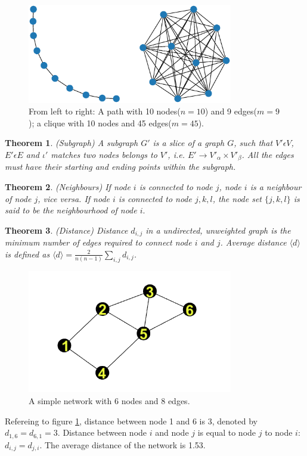 \documentclass[12pt]{article}
\newtheorem{theorem}{Theorem}[section]
\begin{document}
\begin{figure}[!h]
    \centering
    \includegraphics[width=0.8\textwidth]{path_clique.eps}
    \caption{From left to right: A path with 10 nodes($n=10$) and 9 edges($m=9$); a clique with 10 nodes and 45 edges($m=45$).}
\end{figure}
\begin{theorem}{(Subgraph)}
    A subgraph $G'$ is a slice of a graph $G$, such that $V' \epsilon V$, $E' \epsilon E$ and $\iota'$ matches two nodes belongs to $V'$, i.e. $E'\rightarrow V'_\alpha\times V'_\beta $. All the edges must have their starting and ending points within the subgraph.
\end{theorem}
\begin{theorem}{(Neighbours)}
    If node $i$ is connected to node $j$, node $i$ is a neighbour of node $j$, vice versa. If node $i$ is connected to node $j,k,l$, the node set $\{j,k,l\}$ is said to be the neighbourhood of node $i.$
\end{theorem}
\begin{theorem}{(Distance)}
    Distance $d_{i,j}$ in a undirected, unweighted graph is the minimum number of edges required to connect node $i$ and $j$. Average distance $\langle d\rangle$ is defined as $\langle d \rangle = \frac{2}{n(n-1)}\sum_{i,j}d_{i,j}$.
\end{theorem}
\begin{figure}[!h]
    \centering
    \includegraphics[width=0.8\textwidth]{simplenetwork.png}
    \caption{A simple network with 6 nodes and 8 edges.}
    \label{fig:simple_network}
\end{figure}
\par
Refereing to figure \ref{fig:simple_network}, distance between node 1 and 6 is 3, denoted by $d_{1,6}=d_{6,1}=3$. Distance between node $i$ and node $j$ is equal to node $j$ to node $i$: $d_{i,j}=d_{j,i}$. The average distance of the network is 1.53.
\end{document}
